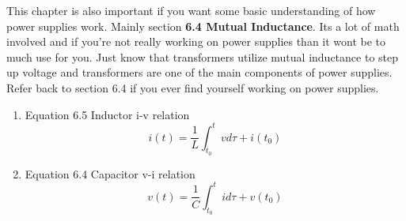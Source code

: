 \documentclass[11pt]{article}
\begin{document}
This chapter is also important if you want some basic understanding of how power supplies work.
Mainly section \textbf{6.4 Mutual Inductance}. Its a lot of math involved and if you're not really working
on power supplies than it wont be to much use for you. Just know that transformers utilize mutual
inductance to step up voltage and transformers are one of the main components of power supplies.
Refer back to section 6.4 if you ever find yourself working on power supplies.
\begin{enumerate}
\item Equation 6.5 Inductor i-v relation
\label{sec:orgf465f24}
$$i(t) = \frac{1}{L}\int^{t}_{t_0}{vd\tau} + i(t_0)$$
\item Equation 6.4 Capacitor v-i relation
\label{sec:org30046ba}
$$v(t) = \frac{1}{C}\int^{t}_{t_0}{id\tau} + v(t_0)$$
\end{enumerate}
\end{document}
